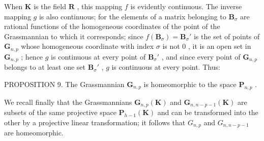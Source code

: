 When \(\mathbf{K}\) is the field \(\mathbf{R}\) , this mapping \(f\) is evidently continuous. The inverse mapping \(g\) is also continuous; for the elements of a matrix belonging to \(\mathbf{B}_{\sigma}\) are rational functions of the homogeneous coordinates of the point of the Grassmannian to which it corresponds; since \(f(\mathbf{B}_{\sigma}) = \mathbf{B}_{\sigma}'\) is the set of points of \(\mathbf{G}_{n,p}\) whose homogeneous coordinate with index \(\sigma\) is not \(0\) , it is an open set in \(\mathbf{G}_{n,p}\) ; hence \(g\) is continuous at every point of \(\mathbf{B}_{\sigma}'\) , and since every point of \(\mathbf{G}_{n,p}\) belongs to at least one set \(\mathbf{B}_{\sigma}'\) , \(g\) is continuous at every point. Thus:

PROPOSITION 9. The Grassmannian \(\mathbf{G}_{n,p}\) is homeomorphic to the space \(\mathbf{P}_{n,p}\) .

We recall finally that the Grassmannians \(\mathbf{G}_{n,p}(\mathbf{K})\) and \(\mathbf{G}_{n,n-p-1}(\mathbf{K})\) are subsets of the same projective space \(\mathbf{P}_{h-1}(\mathbf{K})\) and can be transformed into the other by a projective linear transformation; it follows that \(G_{n,p}\) and \(G_{n,n-p-1}\) are homeomorphic.
